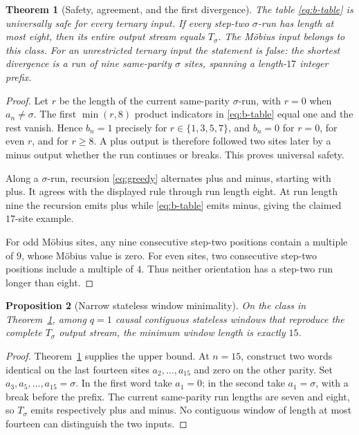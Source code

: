 \documentclass[11pt]{article}
\newtheorem{theorem}{Theorem}[section]
\newtheorem{proposition}[theorem]{Proposition}
\theoremstyle{definition}
\theoremstyle{remark}
\begin{document}
\begin{theorem}[Safety, agreement, and the first divergence]
\label{thm:ell15}
The table \eqref{eq:b-table} is universally safe for every ternary input.
If every step-two $\sigma$-run has length at most eight, then its entire
output stream equals $T_\sigma$.  The M\"obius input belongs to this class.
For an unrestricted ternary input the statement is false: the shortest
divergence is a run of nine same-parity $\sigma$ sites, spanning a
length-$17$ integer prefix.
\end{theorem}

\begin{proof}
Let $r$ be the length of the current same-parity $\sigma$-run, with $r=0$
when $a_n\ne\sigma$.  The first $\min(r,8)$ product indicators in
\eqref{eq:b-table} equal one and the rest vanish.  Hence $b_n=1$ precisely
for $r\in\{1,3,5,7\}$, and $b_n=0$ for $r=0$, for even $r$, and for
$r\ge8$.  A plus output is therefore followed two sites later by a minus
output whether the run continues or breaks.  This proves universal safety.

Along a $\sigma$-run, recursion \eqref{eq:greedy} alternates plus and minus,
starting with plus.  It agrees with the displayed rule through run length
eight.  At run length nine the recursion emits plus while
\eqref{eq:b-table} emits minus, giving the claimed $17$-site example.

For odd M\"obius sites, any nine consecutive step-two positions contain a
multiple of $9$, whose M\"obius value is zero.  For even sites, two
consecutive step-two positions include a multiple of $4$.  Thus neither
orientation has a step-two run longer than eight.
\end{proof}

\begin{proposition}[Narrow stateless window minimality]
\label{prop:ell15-minimal}
On the class in Theorem~\ref{thm:ell15}, among $q=1$ causal contiguous
stateless windows that reproduce the complete $T_\sigma$ output stream,
the minimum window length is exactly $15$.
\end{proposition}

\begin{proof}
Theorem~\ref{thm:ell15} supplies the upper bound.  At $n=15$, construct two
words identical on the last fourteen sites $a_2,\ldots,a_{15}$ and zero on
the other parity.  Set
$a_3,a_5,\ldots,a_{15}=\sigma$.  In the first word take $a_1=0$; in the
second take $a_1=\sigma$, with a break before the prefix.  The current
same-parity run lengths are seven and eight, so $T_\sigma$ emits respectively
plus and minus.  No contiguous window of length at most fourteen can
distinguish the two inputs.
\end{proof}
\end{document}
